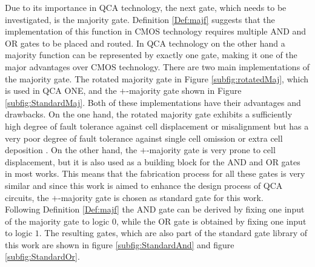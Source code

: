 Due to its importance in QCA technology, the next gate, which needs to be investigated, is the majority gate. Definition \ref{Def:majf} suggests that the implementation of this function in CMOS technology requires multiple AND and OR gates to be placed and routed. In QCA technology on the other hand a majority function can be represented by exactly one gate, making it one of the major advantages over CMOS technology. There are two main implementations of the majority gate. The rotated majority gate in Figure \ref{subfig:rotatedMaj}, which is used in QCA ONE, and the $+$-majority gate shown in Figure \ref{subfig:StandardMaj}. Both of these implementations have their advantages and drawbacks. On the one hand, the rotated majority gate exhibits a sufficiently high degree of fault tolerance against cell displacement or misalignment but has a very poor degree of fault tolerance against single cell omission or extra cell deposition \cite{majorityrotated}. On the other hand, the $+$-majority gate is very prone to cell displacement, but it is also used as a building block for the AND and OR gates in most works. This means that the fabrication process for all these gates is very similar and since this work is aimed to enhance the design process of QCA circuits, the $+$-majority gate is chosen as standard gate for this work.\\
Following Definition \ref{Def:majf} the AND gate can be derived by fixing one input of the majority gate to logic $0$, while the OR gate is obtained by fixing one input to logic $1$. The resulting gates, which are also part of the standard gate library of this work are shown in figure \ref{subfig:StandardAnd} and figure \ref{subfig:StandardOr}.\\

